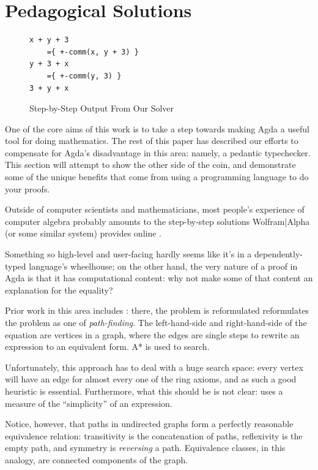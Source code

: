 \documentclass[acmsmall,review,anonymous]{acmart}\settopmatter{printfolios=true,printccs=false,printacmref=false}
\theoremstyle{remark}
\begin{document}
\section{Pedagogical Solutions} \label{pedagogical}
\begin{figure}
\begin{BVerbatim}
x + y + 3
    ={ +-comm(x, y + 3) }
y + 3 + x
    ={ +-comm(y, 3) }
3 + y + x
\end{BVerbatim}
  \caption{Step-by-Step Output From Our Solver}
  \label{step-output}
\end{figure}
One of the core aims of this work is to take a step towards making Agda a useful
tool for doing mathematics. The rest of this paper has described our efforts to
compensate for Agda's disadvantage in this area: namely, a pedantic typechecker.
This section will attempt to show the other side of the coin, and demonstrate
some of the unique benefits that come from using a programming language to do
your proofs.

Outside of computer scientists and mathematicians, most people's experience of
computer algebra probably amounts to the step-by-step solutions Wolfram|Alpha
(or some similar system) provides online
\cite{the_development_team_step-by-step_2009}.

Something so high-level and user-facing hardly seems like it's in a
dependently-typed language's wheelhouse; on the other hand, the very nature of a
proof in Agda is that it has computational content: why not make some of that
content an explanation for the equality?

Prior work in this area includes \citet{lioubartsev_constructing_2016}: there,
the problem is reformulated  reformulates the problem as one of
\emph{path-finding}. The left-hand-side and right-hand-side of the equation are
vertices in a graph, where the edges are single steps to rewrite an expression
to an equivalent form. A* is used to search.

Unfortunately, this approach has to deal with a huge search space: every vertex
will have an edge for almost every one of the ring axioms, and as such a good
heuristic is essential. Furthermore, what this should be is not clear:
\citet{lioubartsev_constructing_2016} uses a measure of the ``simplicity'' of an
expression.

Notice, however, that paths in undirected graphs form a perfectly reasonable
equivalence relation: transitivity is the concatenation of paths, reflexivity is
the empty path, and symmetry is \emph{reversing} a path. Equivalence classes, in
this analogy, are connected components of the graph.
\end{document}
